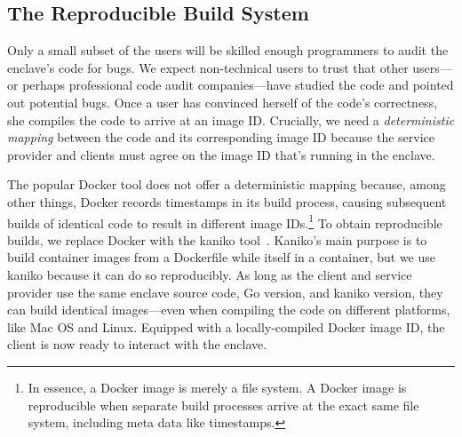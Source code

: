 

\subsection{The Reproducible Build System}
\label{sec:build-system}

Only a small subset of the users will be skilled enough programmers to audit
the enclave's code for bugs.  We expect non-technical users to trust that other
users---or perhaps professional code audit companies---have studied the code
and pointed out potential bugs.  Once a user has convinced herself of the code's
correctness, she compiles the code to arrive at an image ID.  Crucially, we
need a \emph{deterministic mapping} between the code and its corresponding
image ID because the service provider and clients must agree on the image ID
that's running in the enclave.

The popular Docker tool does not offer a deterministic mapping because, among
other things, Docker records timestamps in its build process, causing subsequent
builds of identical code to result in different image IDs.\footnote{In essence,
a Docker image is merely a file system.  A Docker image is reproducible when
separate build processes arrive at the exact same file system, including meta
data like timestamps.}  To obtain reproducible builds, we replace Docker with
the kaniko tool~\cite{kaniko}.  Kaniko's main purpose is to build container
images from a Dockerfile while itself in a container, but we use kaniko because
it can do so reproducibly.  As long as the client and service provider use the
same enclave source code, Go version, and kaniko version, they can build
identical images---even when compiling the code on different platforms, like Mac
OS and Linux.  Equipped with a locally-compiled Docker image ID, the client is
now ready to interact with the enclave.

